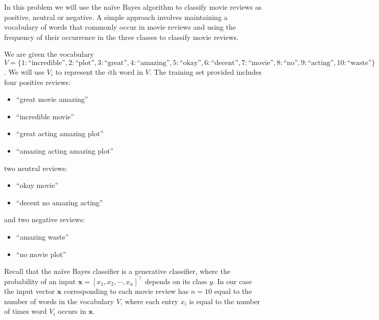 \documentclass[a3paper,12pt]{extarticle} %
\begin{document}
In this problem we will use the na\"ive Bayes algorithm to classify movie reviews as positive, neutral or negative. A simple approach involves maintaining a vocabulary of words that commonly occur in movie reviews and using the frequency of their occurrence in the three classes to classify movie reviews.

We are given the vocabulary $V = \{ 1:\text{``incredible''}, 2:\text{``plot''}, 3:\text{``great''}, 4:\text{``amazing''}, 5:\text{``okay''}, 6:\text{``decent''}, 7:\text{``movie''}, 8:\text{``no''}, 9:\text{``acting''}, 10:\text{``waste''} \}$. We will use $V_i$ to represent the $i$th word in $V$. The training set provided includes four positive reviews:
\begin{itemize}
    \item ``great movie amazing''
    \item ``incredible movie''
    \item ``great acting amazing plot''
    \item ``amazing acting amazing plot''
\end{itemize}
two neutral reviews:
\begin{itemize}
    \item ``okay movie''
    \item ``decent no amazing acting''
\end{itemize}
and two negative reviews:
\begin{itemize}
    \item ``amazing waste''
    \item ``no movie plot''
\end{itemize}

Recall that the na\"ive Bayes classifier is a generative classifier, where the probability of an input $\mathbf{x} = [x_1, x_2, \cdots, x_n]^\top$ depends on its class $y$. In our case the input vector $\mathbf{x}$ corresponding to each movie review has $n = 10$ equal to the number of words in the vocabulary $V$, where each entry $x_i$ is equal to the number of times word $V_i$ occurs in $\mathbf{x}$.
\end{document}
